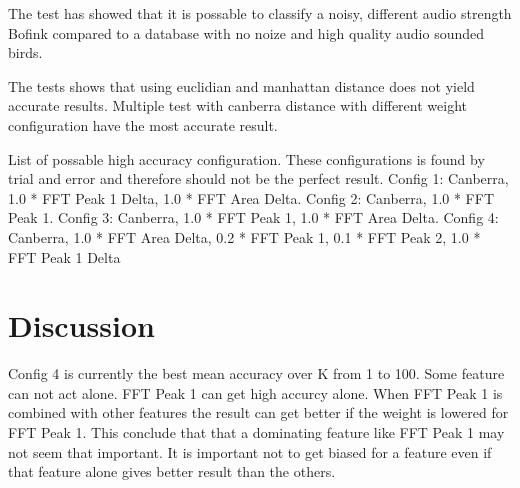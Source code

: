 The test has showed that it is possable to classify a noisy, different audio strength Bofink compared to a database with no noize and high quality audio sounded birds.

The tests shows that using euclidian and manhattan distance does not yield accurate results.
Multiple test with canberra distance with different weight configuration have the most accurate result.

List of possable high accuracy configuration.
These configurations is found by trial and error and therefore should not be the perfect result.
Config 1: Canberra, 1.0 * FFT Peak 1 Delta, 1.0 * FFT Area Delta.
Config 2: Canberra, 1.0 * FFT Peak 1.
Config 3: Canberra, 1.0 * FFT Peak 1, 1.0 * FFT Area Delta.
Config 4: Canberra, 1.0 * FFT Area Delta, 0.2 * FFT Peak 1, 0.1 * FFT Peak 2, 1.0 * FFT Peak 1 Delta

\section{Discussion}
Config 4 is currently the best mean accuracy over K from 1 to 100.
Some feature can not act alone. FFT Peak 1 can get high accurcy alone. When FFT Peak 1 is combined with other features the result can get better if the weight is lowered for FFT Peak 1. This conclude that that a dominating feature like FFT Peak 1 may not seem that important. It is important not to get biased for a feature even if that feature alone gives better result than the others.
